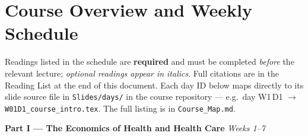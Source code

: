 \documentclass[11pt, a4paper]{article}
\begin{document}
\section{Course Overview and Weekly Schedule}

Readings listed in the schedule are \textbf{required} and must be completed \emph{before} the relevant lecture; \emph{optional readings appear in italics}. Full citations are in the Reading List at the end of this document. Each day ID below maps directly to its slide source file in \texttt{Slides/days/} in the course repository --- e.g.\ day W1\,D1 $\rightarrow$ \texttt{W01D1\_course\_intro.tex}. The full listing is in \texttt{Course\_Map.md}.

\vspace{0.8em}
\begin{mdframed}[style=goldstyle]
\textbf{\large\color{OtagoBlue} Part I — The Economics of Health and Health Care} \hfill \textit{Weeks 1--7}
\end{mdframed}
\end{document}

